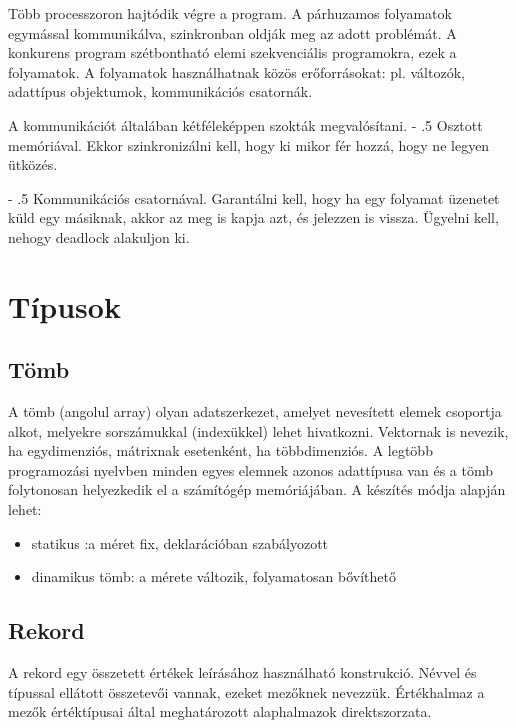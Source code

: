 \documentclass[margin=0px]{article}
\makeatletter
\renewcommand\paragraph{%
    \@startsection{paragraph}{4}{0mm}%
    {-\baselineskip}%
    {.5\baselineskip}%
    {\normalfont\normalsize\bfseries}}
\makeatother
\begin{document}
Több processzoron hajtódik végre a program. A párhuzamos folyamatok egymással kommunikálva, szinkronban oldják meg az adott problémát. A konkurens program szétbontható elemi szekvenciális programokra, ezek a folyamatok. A folyamatok használhatnak közös erőforrásokat: pl. változók, adattípus  objektumok, kommunikációs csatornák.

A kommunikációt általában kétféleképpen szokták megvalósítani.
\paragraph{Osztott memóriával.} Ekkor szinkronizálni kell, hogy ki mikor fér hozzá, hogy ne legyen ütközés.

\paragraph{Kommunikációs csatornával.} Garantálni kell, hogy ha egy folyamat üzenetet küld egy másiknak, akkor az meg is kapja azt, és jelezzen is vissza. Ügyelni kell, nehogy deadlock alakuljon ki.


\section{Típusok}

\subsection{Tömb}

A tömb (angolul array) olyan adatszerkezet, amelyet nevesített elemek csoportja alkot, melyekre sorszámukkal (indexükkel) lehet hivatkozni. Vektornak is nevezik, ha egydimenziós, mátrixnak esetenként, ha többdimenziós. A legtöbb programozási nyelvben minden egyes elemnek azonos adattípusa van és a tömb folytonosan helyezkedik el a számítógép memóriájában. A készítés módja alapján lehet:

\begin{itemize}
    \item	statikus :a méret fix, deklarációban szabályozott
    \item	dinamikus tömb: a mérete változik, folyamatosan bővíthető
\end{itemize}

\subsection{Rekord}

A rekord egy összetett értékek leírásához használható konstrukció. Névvel és típussal ellátott összetevői vannak, ezeket mezőknek nevezzük.
Értékhalmaz a mezők értéktípusai által meghatározott alaphalmazok direktszorzata.
\end{document}
